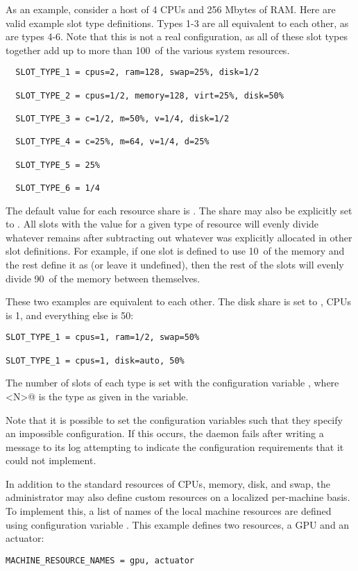 \begin{description}
As an example, consider a
host of 4 CPUs and 256 Mbytes of RAM.
Here are valid example slot type definitions. 
Types 1-3 are all equivalent to each other, as are types 4-6.
Note that this is not a real configuration, as all of these slot types together
add up to more than 100\Percent\ of the various system resources.

\begin{verbatim}
  SLOT_TYPE_1 = cpus=2, ram=128, swap=25%, disk=1/2

  SLOT_TYPE_2 = cpus=1/2, memory=128, virt=25%, disk=50%

  SLOT_TYPE_3 = c=1/2, m=50%, v=1/4, disk=1/2

  SLOT_TYPE_4 = c=25%, m=64, v=1/4, d=25%

  SLOT_TYPE_5 = 25%

  SLOT_TYPE_6 = 1/4
\end{verbatim}

The default value for each resource share is .  The share
may also be explicitly set to .  All slots with the value
 for a given type of resource will evenly divide
whatever remains after subtracting out whatever was explicitly
allocated in other slot definitions.  For example, if one slot is
defined to use 10\Percent\ of the memory and the rest define it as
 (or leave it undefined), then the rest of the slots will
evenly divide 90\Percent\ of the memory between themselves.

These two examples are equivalent to each other.
The disk share is set to ,
CPUs is 1, and everything else is 50\Percent:

\begin{verbatim}
SLOT_TYPE_1 = cpus=1, ram=1/2, swap=50%

SLOT_TYPE_1 = cpus=1, disk=auto, 50%
\end{verbatim}

The number of slots of each type is set with the
configuration variable
,
where \verb@<N>@ is the type as given in the
 variable.

Note that it is possible to set the configuration variables such
that they specify an impossible configuration.
If this occurs, the  daemon fails after writing
a message to its log attempting to indicate the configuration
requirements that it could not implement.

In addition to the standard resources of CPUs, memory, disk, and swap,
the administrator may also define custom resources on 
a localized per-machine basis.
To implement this, 
a list of names of the local machine resources are defined using configuration 
variable .
This example defines two resources,
a GPU and an actuator:
\begin{verbatim}
MACHINE_RESOURCE_NAMES = gpu, actuator
\end{verbatim}


\end{description}
